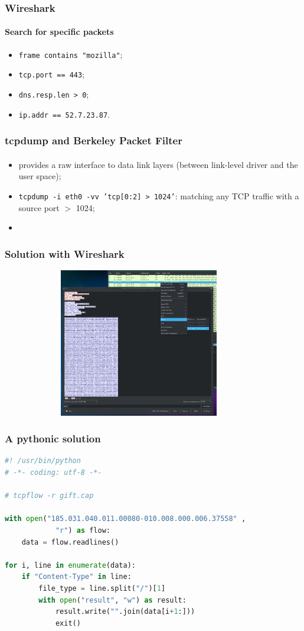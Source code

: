 \documentclass[]{beamer}
\begin{document}
\begin{frame}
\frametitle{Wireshark}
\framesubtitle{Search for specific packets}
\begin{itemize}
    \item \texttt{frame contains "mozilla"};
    \item \texttt{tcp.port == 443};
    \item \texttt{dns.resp.len > 0};
    \item \texttt{ip.addr == 52.7.23.87}.
\end{itemize}
\end{frame}

\begin{frame}
\frametitle{tcpdump and Berkeley Packet Filter}
\framesubtitle{}
\begin{itemize}
    \item provides a raw interface to data link layers (between link-level driver and the user space);
    \item \texttt{tcpdump -i eth0 -vv 'tcp[0:2] > 1024'}: matching any TCP traffic with a source port $>$ 1024;
    \item 
\end{itemize}
\end{frame}


\begin{frame}
\frametitle{Solution with Wireshark}
\begin{center}
    \includegraphics[height=6.5cm, width=12.0cm]{./images/Wireshark_follow_http_stream.png}
\end{center}
\end{frame}
 


\begin{frame}[fragile]
\frametitle{A pythonic solution}
\begin{lstlisting}[language=Python]
#! /usr/bin/python
# -*- coding: utf-8 -*-

# tcpflow -r gift.cap

with open("185.031.040.011.00080-010.008.000.006.37558" ,
            "r") as flow:
    data = flow.readlines()

for i, line in enumerate(data):
    if "Content-Type" in line:
        file_type = line.split("/")[1]
        with open("result", "w") as result:
            result.write("".join(data[i+1:]))
            exit()
\end{lstlisting}
\end{frame}
 
\end{document}
